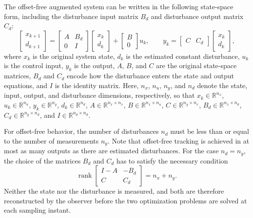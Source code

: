 \documentclass[preprint,12pt,authoryear]{elsarticle}
\theoremstyle{remark}
\begin{document}
The offset-free augmented system can be written in the following state-space form, including the disturbance input matrix $B_d$ and disturbance output matrix $C_d$:
\begin{equation}
  \label{eq:of:ss}
  \begin{bmatrix}
    x_{k+1} \\
    d_{k+1}
  \end{bmatrix}
  =
  \begin{bmatrix}
    A & B_d \\
    0 & I
  \end{bmatrix}
  \begin{bmatrix}
    x_k \\
    d_k
  \end{bmatrix}
  +
  \begin{bmatrix}
    B \\
    0
  \end{bmatrix}
  u_k,
  \qquad
  y_k =
  \begin{bmatrix}
    C & C_d
  \end{bmatrix}
  \begin{bmatrix}
    x_k \\
    d_k
  \end{bmatrix},
\end{equation}
where $x_k$ is the original system state, $d_k$ is the estimated constant disturbance, $u_k$ is the control input, $y_k$ is the output, $A$, $B$, and $C$ are the original state-space matrices, $B_d$ and $C_d$ encode how the disturbance enters the state and output equations, and $I$ is the identity matrix.
Here, $n_x$, $n_u$, $n_y$, and $n_d$ denote the state, input, output, and disturbance dimensions, respectively, so that $x_k \in \mathbb{R}^{n_x}$, $u_k \in \mathbb{R}^{n_u}$, $y_k \in \mathbb{R}^{n_y}$, $d_k \in \mathbb{R}^{n_d}$, $A \in \mathbb{R}^{n_x \times n_x}$, $B \in \mathbb{R}^{n_x \times n_u}$, $C \in \mathbb{R}^{n_y \times n_x}$, $B_d \in \mathbb{R}^{n_x \times n_d}$, $C_d \in \mathbb{R}^{n_y \times n_d}$, and $I \in \mathbb{R}^{n_d \times n_d}$.

For offset-free behavior, the number of disturbances $n_d$ must be less than or equal to the number of measurements $n_y$. Note that offset-free tracking is achieved in at most as many outputs as there are estimated disturbances. For the case $n_d = n_y$, the choice of the matrices $B_d$ and $C_d$ has to satisfy the necessary condition
\begin{equation}
  \label{eq:of:rank}
  \operatorname{rank}
  \begin{bmatrix}
    I - A & -B_d \\
    C & C_d
  \end{bmatrix}
  = n_x + n_y.
\end{equation}
Neither the state nor the disturbance is measured, and both are therefore reconstructed by the observer before the two optimization problems are solved at each sampling instant.
\end{document}
